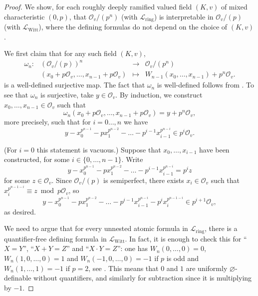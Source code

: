 \documentclass[a4paper]{amsart}
\theoremstyle{mystyle2}
\theoremstyle{mystyle}
\newcommand{\emptydefinition}{\emptyset}
\renewcommand{\emptyset}{\varnothing}
\newcommand{\map}[1]{\omega_{#1}}
\renewcommand{\L}{\mathcal{L}}
\newcommand{\Lring}{\L_{\mathrm{ring}}}
\newcommand{\LWitt}{\L_{\mathrm{Witt}}}
\renewcommand{\O}{\mathcal{O}}
\numberwithin{equation}{section}
\begin{document}
    \begin{proof}
        We show, for each roughly deeply ramified valued field \( (K,v) \) of mixed characteristic \((0,p)\), that \(\O_v/(p^n)\) (with \(\Lring\)) is interpretable in \(\O_v/(p)\) (with \(\LWitt\)), where the defining formulas do not depend on the choice of \( (K,v) \).

        We first claim that for any such field \( (K,v) \), 
        \[
        \begin{array}{rrcl}
        \map{n}\colon &\left(\O_v/(p)\right)^n & \longrightarrow & \O_v/(p^n)\\
        &(x_0+p\O_v,\ldots,x_{n-1}+p\O_v) & \longmapsto & W_{n-1}(x_0,\ldots,x_{n-1})+p^n\O_v.
        \end{array}
        \]
        is a well-defined surjective map.
        The fact that $\map{n}$ is well-defined follows from .
        To see that $\map{n}$ is surjective, take $y\in \O_v$.
        By induction, we construct $x_0, \ldots, x_{n-1}\in \O_v$ such that 
        \[
        \map{n} (x_0 + p\O_v, \dotsc, x_{n-1}+ p\O_v) = y+p^n\O_v, \]
        more precisely, such that for $i= 0 \ldots, n$ we have
        \[
        y - x_0^{p^{n-1}} - px_1^{p^{n-2}} - \ldots - p^{i-1}x_{i-1}^{p^{n-i}}\in p^{i}\O_v.
        \]
 
        (For $i=0$ this statement is vacuous.)
        Suppose that $x_0, \ldots, x_{i-1}$ have been constructed, for some $i \in \{0, \ldots, n-1\}$.
        Write 
        \[
        y - x_0^{p^{n-1}} - px_1^{p^{n-2}} - \ldots - p^{i-1}x_{i-1}^{p^{n-i}} = p^{i}z
        \]
        for some $z\in \O_v$.
        Since $\O_v/(p)$ is semiperfect, there exists $x_{i}\in \O_v$ such that $x_{i}^{p^{n-1-i}} \equiv z\bmod p\O_v$, so
        \[
        y - x_0^{p^{n-1}} - px_1^{p^{n-2}} - \ldots - p^{i-1}x_{i-1}^{p^{n-i}}- p^{i}x_{i}^{p^{n-1-i}}\in p^{i+1}\O_v,
        \]
        as desired.
        
        We need to argue that for every unnested atomic formula in \(\Lring\), there is a quantifier-free defining formula in \(\LWitt\).
        In fact, it is enough to check this for \enquote{\(X=Y\)}, \enquote{\(X+Y=Z\)} and \enquote{\(X\cdot Y=Z\)}: one has \(W_n(0,\ldots,0)=0\), \(W_n(1,0,\ldots,0)=1\) and \(W_n(-1,0,\ldots,0)=-1\) if \(p\) is odd and \(W_n(1,\ldots,1)=-1\) if \(p=2\), see \cite[Exercise on page 135]{vdd}. This means that \(0\) and \(1\) are uniformly \( \emptydefinition \)-definable without quantifiers, and similarly for subtraction since it is multiplying by \(-1\).


\end{proof}
\end{document}
